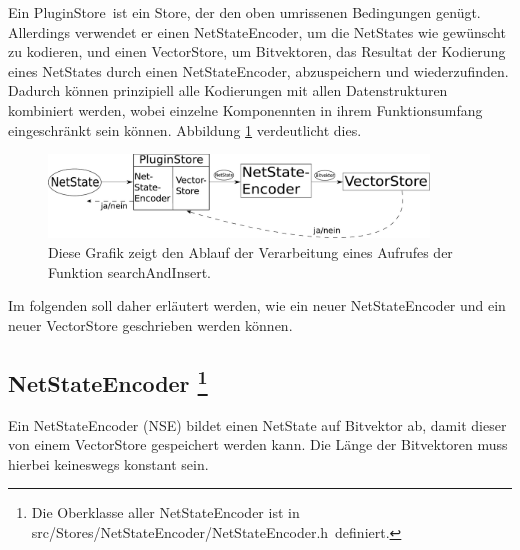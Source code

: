 \documentclass[12pt,a4paper,titlepage]{scrartcl}
\renewcommand \( {\left (}
\renewcommand \) {\right )}
\renewcommand \[ {\left [}
\renewcommand \] {\right ]}
\newcommand \Flqq {\flqq\ }
\begin{document}
Ein \frqq PluginStore\Flqq ist ein Store, der den oben umrissenen Bedingungen genügt. Allerdings verwendet er einen NetStateEncoder, um die NetStates wie gewünscht zu kodieren, und einen VectorStore, um Bitvektoren, das Resultat der Kodierung eines NetStates durch einen NetStateEncoder, abzuspeichern und wiederzufinden. Dadurch können prinzipiell alle Kodierungen mit allen Datenstrukturen kombiniert werden, wobei einzelne Komponennten in ihrem Funktionsumfang eingeschränkt sein können. Abbildung \ref{fig:plugin} verdeutlicht dies.
\begin{figure}[ht]
	\begin{center}
		\includegraphics[width = 0.9\textwidth]{Schema.pdf}
		\caption{Diese Grafik zeigt den Ablauf der Verarbeitung eines Aufrufes der Funktion \frqq searchAndInsert\flqq .}
		\label{fig:plugin}
	\end{center}
\end{figure}

Im folgenden soll daher erläutert werden, wie ein neuer NetStateEncoder und ein neuer VectorStore geschrieben werden können.


\subsection{NetStateEncoder
\protect\footnote{Die Oberklasse aller NetStateEncoder ist in \frqq src/Stores/NetStateEncoder/NetStateEncoder.h\Flqq definiert.}}
\label{kap:NetStateEncoder}
Ein NetStateEncoder (NSE) bildet einen NetState auf Bitvektor ab, damit dieser von einem VectorStore gespeichert werden kann. Die Länge der Bitvektoren muss hierbei keineswegs konstant sein.
\end{document}

